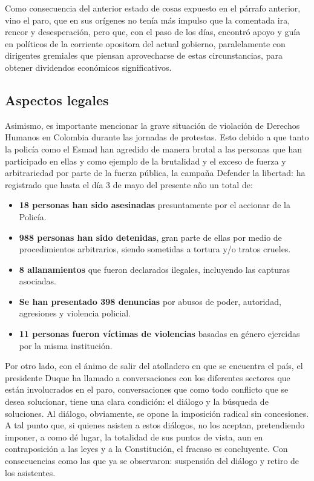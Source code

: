 \documentclass[doc, 12pt, letterpaper, donotrepeattitle, floatsintext, natbib]{apa7}
\begin{document}
Como consecuencia del anterior estado de cosas expuesto en el párrafo anterior, vino el paro, que en sus orígenes no tenía más impulso que la comentada ira, rencor y desesperación, pero que, con el paso de los días, encontró apoyo y guía en políticos de la corriente opositora del actual gobierno, paralelamente con dirigentes gremiales que piensan aprovecharse de estas circunstancias, para obtener dividendos económicos significativos.

\subsection{Aspectos legales}
Asimismo, es importante mencionar la grave situación de violación de Derechos Humanos en Colombia durante las jornadas de protestas. Esto debido a que tanto la policía como el Esmad han agredido de manera brutal a las personas que han participado en ellas y como ejemplo de la brutalidad y el exceso de fuerza y arbitrariedad por parte de la fuerza pública, la campaña Defender la libertad: ha registrado que hasta el día 3 de mayo del presente año un total de:
\begin{itemize}
    \item \textbf{18 personas han sido asesinadas} presuntamente por el accionar de la Policía.
    \item \textbf{988 personas han sido detenidas}, gran parte de ellas por medio de procedimientos arbitrarios, siendo sometidas a tortura y/o tratos crueles.
    \item \textbf{8 allanamientos} que fueron declarados ilegales, incluyendo las capturas asociadas.
    \item \textbf{Se han presentado 398 denuncias} por abusos de poder, autoridad, agresiones y violencia policial.
    \item \textbf{11 personas fueron víctimas de violencias} basadas en género ejercidas por la misma institución.
\end{itemize}


Por otro lado, con el ánimo de salir del atolladero en que se encuentra el país, el presidente Duque ha llamado a conversaciones con los diferentes sectores que están involucrados en el paro, conversaciones que como todo conflicto que se desea solucionar, tiene una clara condición: el diálogo y la búsqueda de soluciones. Al diálogo, obviamente, se opone la imposición radical sin concesiones. A tal punto que, si quienes asisten a estos diálogos, no los aceptan, pretendiendo imponer, a como dé lugar, la totalidad de sus puntos de vista, aun en contraposición a las leyes y a la Constitución, el fracaso es concluyente. Con consecuencias como las que ya se observaron: suspensión del diálogo y retiro de los asistentes.
\end{document}
